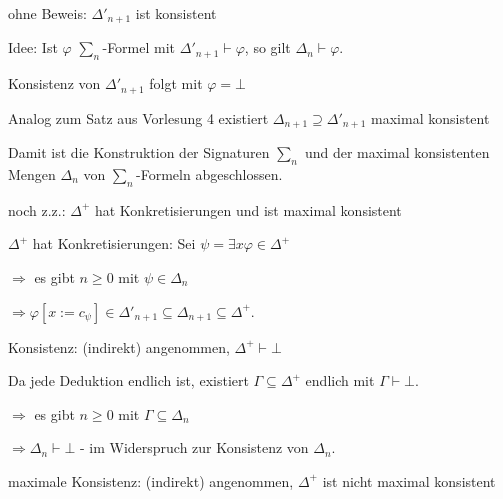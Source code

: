 \documentclass[a4paper]{article}
\begin{document}
\begin{multicols}{3}
\begin{enumerate*}
          \begin{itemize*}
            \item
                  ohne Beweis: $\Delta'_{n+1}$ ist konsistent
            \item
                  Idee: Ist $\varphi$ $\sum_n$-Formel mit
                  $\Delta'_{n+1}\vdash\varphi$, so gilt $\Delta_n\vdash\varphi$.
            \item
                  Konsistenz von $\Delta'_{n+1}$ folgt mit $\varphi=\bot$
            \item
                  Analog zum Satz aus Vorlesung 4 existiert
                  $\Delta_{n+1}\supseteq \Delta'_{n+1}$ maximal konsistent
          \end{itemize*}
  \end{enumerate*}

  \begin{itemize*}
    \itemsep1pt\parskip0pt
    \item
          Damit ist die Konstruktion der Signaturen $\sum_n$ und der maximal
          konsistenten Mengen $\Delta_n$ von $\sum_n$-Formeln abgeschlossen.
    \item
          noch z.z.: $\Delta^+$ hat Konkretisierungen und ist maximal konsistent
    \item
          $\Delta^+$ hat Konkretisierungen: Sei
          $\psi=\exists x\varphi\in\Delta^+$

          \begin{itemize*}
            \item
                  $\Rightarrow$ es gibt $n\geq 0$ mit $\psi\in\Delta_n$
            \item
                  $\Rightarrow \varphi[x:=c_{\psi}]\in\Delta'_{n+1}\subseteq \Delta_{n+1}\subseteq\Delta^+$.
          \end{itemize*}
    \item
          Konsistenz: (indirekt) angenommen, $\Delta^+\vdash\bot$

          \begin{itemize*}
            \item
                  Da jede Deduktion endlich ist, existiert $\Gamma\subseteq\Delta^+$
                  endlich mit $\Gamma\vdash\bot$.
            \item
                  $\Rightarrow$ es gibt $n\geq 0$ mit $\Gamma\subseteq\Delta_n$
            \item
                  $\Rightarrow \Delta_n\vdash\bot$ - im Widerspruch zur Konsistenz von
                  $\Delta_n$.
          \end{itemize*}
    \item
          maximale Konsistenz: (indirekt) angenommen, $\Delta^+$ ist nicht
          maximal konsistent


\end{itemize*}
\end{multicols}
\end{document}
